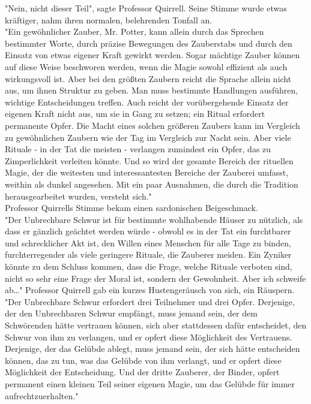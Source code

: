 {"Nein, nicht dieser Teil", sagte Professor Quirrell. Seine Stimme wurde etwas kräftiger, nahm ihren normalen, belehrenden Tonfall an.\\ "Ein gewöhnlicher Zauber, Mr. Potter, kann allein durch das Sprechen bestimmter Worte, durch präzise Bewegungen des Zauberstabs und durch den Einsatz von etwas eigener Kraft gewirkt werden. Sogar mächtige Zauber können auf diese Weise beschworen werden, wenn die Magie sowohl effizient als auch wirkungsvoll ist. Aber bei den größten Zaubern reicht die Sprache allein nicht aus, um ihnen Struktur zu geben. Man muss bestimmte Handlungen ausführen, wichtige Entscheidungen treffen. Auch reicht der vorübergehende Einsatz der eigenen Kraft nicht aus, um sie in Gang zu setzen; ein Ritual erfordert permanente Opfer. Die Macht eines solchen größeren Zaubers kann im Vergleich zu gewöhnlichen Zaubern wie der Tag im Vergleich zur Nacht sein. Aber viele Rituale - in der Tat die meisten - verlangen zumindest ein Opfer, das zu Zimperlichkeit verleiten könnte. Und so wird der gesamte Bereich der rituellen Magie, der die weitesten und interessantesten Bereiche der Zauberei umfasst, weithin als dunkel angesehen. Mit ein paar Ausnahmen, die durch die Tradition herausgearbeitet wurden, versteht sich."\\ Professor Quirrells Stimme bekam einen sardonischen Beigeschmack.\\ "Der Unbrechbare Schwur ist für bestimmte wohlhabende Häuser zu nützlich, als dass er gänzlich geächtet werden würde - obwohl es in der Tat ein furchtbarer und schrecklicher Akt ist, den Willen eines Menschen für alle Tage zu binden, furchterregender als viele geringere Rituale, die Zauberer meiden. Ein Zyniker könnte zu dem Schluss kommen, dass die Frage, welche Rituale verboten sind, nicht so sehr eine Frage der Moral ist, sondern der Gewohnheit. Aber ich schweife ab…" Professor Quirrell gab ein kurzes Hustengeräusch von sich, ein Räuspern.\\ "Der Unbrechbare Schwur erfordert drei Teilnehmer und drei Opfer. Derjenige, der den Unbrechbaren Schwur empfängt, muss jemand sein, der dem Schwörenden hätte vertrauen können, sich aber stattdessen dafür entscheidet, den Schwur von ihm zu verlangen, und er opfert diese Möglichkeit des Vertrauens. Derjenige, der das Gelübde ablegt, muss jemand sein, der sich hätte entscheiden können, das zu tun, was das Gelübde von ihm verlangt, und er opfert diese Möglichkeit der Entscheidung. Und der dritte Zauberer, der Binder, opfert permanent einen kleinen Teil seiner eigenen Magie, um das Gelübde für immer aufrechtzuerhalten."

}
